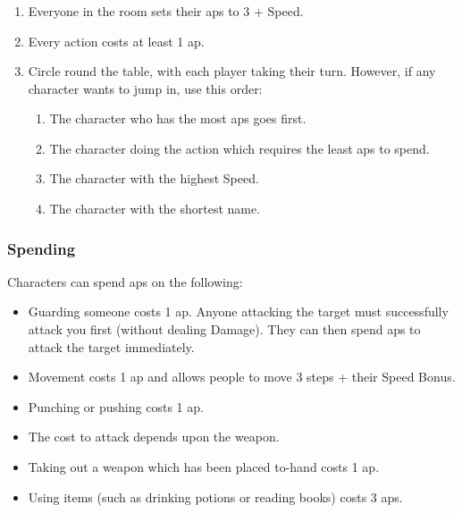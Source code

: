 \subsubsection*{}

\begin{enumerate}

  \item
  Everyone in the room sets their \glspl{ap} to 3 + Speed.
  \item
  Every action costs at least 1 \gls{ap}.
  \item
  Circle round the table, with each player taking their turn.
  However, if any character wants to jump in, use this order:
  \begin{enumerate}
    \item
    The character who has the most \glspl{ap} goes first.
    \item
    The character doing the action which requires the least \glspl{ap} to spend.
    \item
    The character with the highest Speed.
    \item
    The character with the shortest name.
  \end{enumerate}
\end{enumerate}

\subsubsection*{Spending }

Characters can spend \glspl{ap} on the following:

\begin{itemize}
  \item
  Guarding someone costs 1 \gls{ap}.
  Anyone attacking the target must successfully attack you first (without dealing Damage).
  They can then spend \glspl{ap} to attack the target immediately.
  \item
  Movement costs 1 \gls{ap} and allows people to move 3 steps + their Speed Bonus.
  \item
  Punching or pushing costs 1 \gls{ap}.
  \item
  The cost to attack depends upon the weapon.
  \item
  Taking out a weapon which has been placed to-hand costs 1 \gls{ap}.
  \item
  Using items (such as drinking potions or reading books) costs 3 \glspl{ap}.
\end{itemize}

